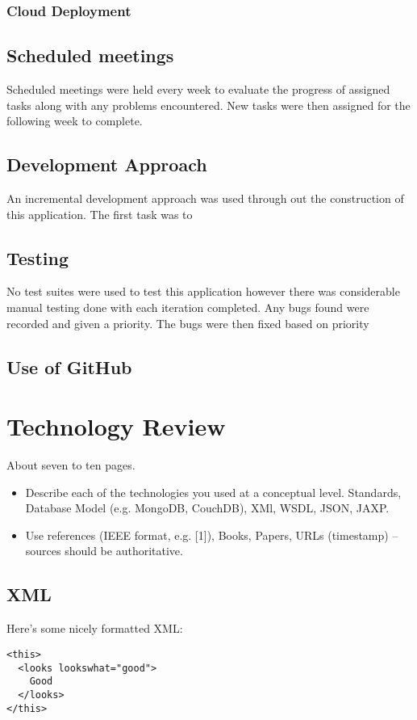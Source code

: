 \subsection{Cloud Deployment}




\section {Scheduled meetings}
Scheduled meetings were held every week to evaluate the progress of assigned tasks along with any problems encountered.
New tasks were then assigned for the following week to complete.

\section{Development Approach}
An incremental development approach was used through out the construction of this application. The first task was to 
\section{Testing}
No test suites were used to test this application however there was considerable manual testing done with each iteration completed. Any bugs found were recorded and given a priority. The bugs were then fixed based on priority 
\section{Use of GitHub}





\chapter{Technology Review}
About seven to ten pages.
\begin{itemize}
\item Describe each of the technologies you used at a conceptual level. Standards, Database Model (e.g. MongoDB, CouchDB), XMl, WSDL, JSON, JAXP.
\item Use references (IEEE format, e.g. [1]), Books, Papers, URLs (timestamp) – sources should be authoritative. 
\end{itemize}

\section{XML}
Here's some nicely formatted XML:
\begin{verbatim}
<this>
  <looks lookswhat="good">
    Good
  </looks>
</this>
\end{verbatim}

